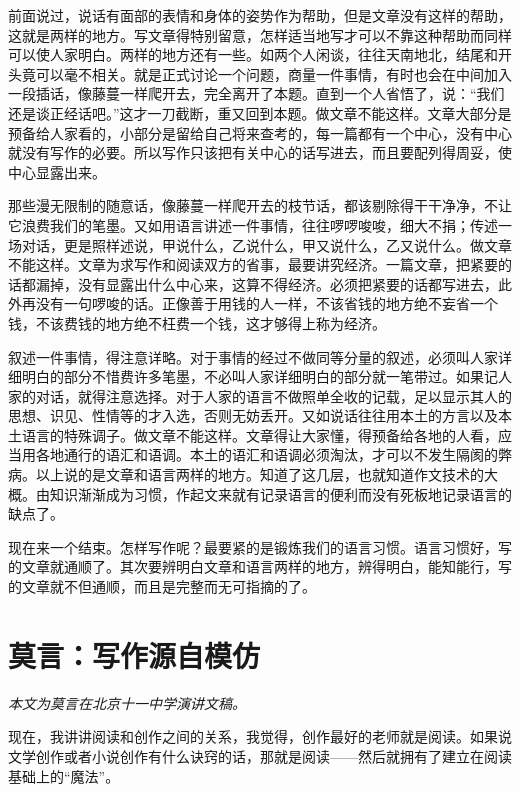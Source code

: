 \documentclass[fontset=fandol,12pt,a5paper]{ctexbook}
\begin{document}
前面说过，说话有面部的表情和身体的姿势作为帮助，但是文章没有这样的帮助，这就是两样的地方。写文章得特别留意，怎样适当地写才可以不靠这种帮助而同样可以使人家明白。两样的地方还有一些。如两个人闲谈，往往天南地北，结尾和开头竟可以毫不相关。就是正式讨论一个问题，商量一件事情，有时也会在中间加入一段插话，像藤蔓一样爬开去，完全离开了本题。直到一个人省悟了，说：“我们还是谈正经话吧。”这才一刀截断，重又回到本题。做文章不能这样。文章大部分是预备给人家看的，小部分是留给自己将来查考的，每一篇都有一个中心，没有中心就没有写作的必要。所以写作只该把有关中心的话写进去，而且要配列得周妥，使中心显露出来。

那些漫无限制的随意话，像藤蔓一样爬开去的枝节话，都该剔除得干干净净，不让它浪费我们的笔墨。又如用语言讲述一件事情，往往啰啰唆唆，细大不捐；传述一场对话，更是照样述说，甲说什么，乙说什么，甲又说什么，乙又说什么。做文章不能这样。文章为求写作和阅读双方的省事，最要讲究经济。一篇文章，把紧要的话都漏掉，没有显露出什么中心来，这算不得经济。必须把紧要的话都写进去，此外再没有一句啰唆的话。正像善于用钱的人一样，不该省钱的地方绝不妄省一个钱，不该费钱的地方绝不枉费一个钱，这才够得上称为经济。

叙述一件事情，得注意详略。对于事情的经过不做同等分量的叙述，必须叫人家详细明白的部分不惜费许多笔墨，不必叫人家详细明白的部分就一笔带过。如果记人家的对话，就得注意选择。对于人家的语言不做照单全收的记载，足以显示其人的思想、识见、性情等的才入选，否则无妨丢开。又如说话往往用本土的方言以及本土语言的特殊调子。做文章不能这样。文章得让大家懂，得预备给各地的人看，应当用各地通行的语汇和语调。本土的语汇和语调必须淘汰，才可以不发生隔阂的弊病。以上说的是文章和语言两样的地方。知道了这几层，也就知道作文技术的大概。由知识渐渐成为习惯，作起文来就有记录语言的便利而没有死板地记录语言的缺点了。

现在来一个结束。怎样写作呢？最要紧的是锻炼我们的语言习惯。语言习惯好，写的文章就通顺了。其次要辨明白文章和语言两样的地方，辨得明白，能知能行，写的文章就不但通顺，而且是完整而无可指摘的了。

\newpage

\section{莫言：写作源自模仿}

\emph{本文为莫言在北京十一中学演讲文稿。}
\vspace{2em}

现在，我讲讲阅读和创作之间的关系，我觉得，创作最好的老师就是阅读。如果说文学创作或者小说创作有什么诀窍的话，那就是阅读——然后就拥有了建立在阅读基础上的“魔法”。
\end{document}
